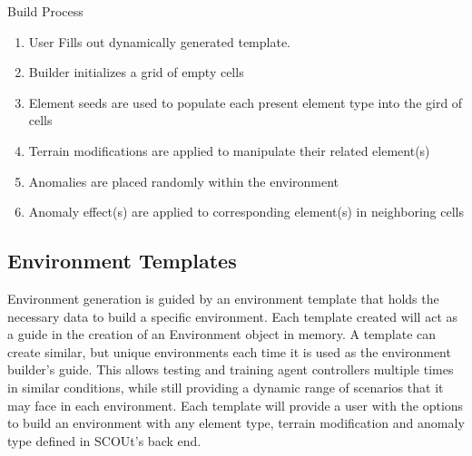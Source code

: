 Build Process
\begin{enumerate}
  \item User Fills out dynamically generated template. 
  \item	Builder initializes a grid of empty cells
  \item	Element seeds are used to populate each present element type into the gird of cells
  \item	Terrain modifications are applied to manipulate their related element(s)
  \item	Anomalies are placed randomly within the environment
  \item	Anomaly effect(s) are applied to corresponding element(s) in neighboring cells
\end{enumerate}


\subsection{Environment Templates}
Environment generation is guided by an environment template that holds the necessary data to build a specific environment.
Each template created will act as a guide in the creation of an Environment object in memory.
A template can create similar, but unique environments each time it is used as the environment builder's guide.
This allows testing and training agent controllers multiple times in similar conditions, while still providing a dynamic range of scenarios that it may face in each environment.
Each template will provide a user with the options to build an environment with any element type, terrain modification and anomaly type defined in SCOUt's back end.



